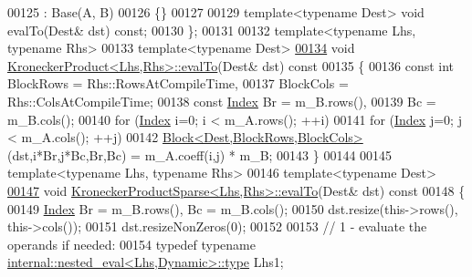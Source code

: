 \begin{DoxyCode}
00125       : Base(A, B)
00126     \{\}
00127 
00129     \textcolor{keyword}{template}<\textcolor{keyword}{typename} Dest> \textcolor{keywordtype}{void} evalTo(Dest& dst) \textcolor{keyword}{const};
00130 \};
00131 
00132 \textcolor{keyword}{template}<\textcolor{keyword}{typename} Lhs, \textcolor{keyword}{typename} Rhs>
00133 \textcolor{keyword}{template}<\textcolor{keyword}{typename} Dest>
\hyperlink{class_eigen_1_1_kronecker_product_a10f65aca36ed69da354e70b300b5a223}{00134} \textcolor{keywordtype}{void} \hyperlink{class_eigen_1_1_kronecker_product_a10f65aca36ed69da354e70b300b5a223}{KroneckerProduct<Lhs,Rhs>::evalTo}(Dest& dst)\textcolor{keyword}{ const}
00135 \textcolor{keyword}{}\{
00136   \textcolor{keyword}{const} \textcolor{keywordtype}{int} BlockRows = Rhs::RowsAtCompileTime,
00137             BlockCols = Rhs::ColsAtCompileTime;
00138   \textcolor{keyword}{const} \hyperlink{namespace_eigen_a62e77e0933482dafde8fe197d9a2cfde}{Index} Br = m\_B.rows(),
00139               Bc = m\_B.cols();
00140   \textcolor{keywordflow}{for} (\hyperlink{namespace_eigen_a62e77e0933482dafde8fe197d9a2cfde}{Index} i=0; i < m\_A.rows(); ++i)
00141     \textcolor{keywordflow}{for} (\hyperlink{namespace_eigen_a62e77e0933482dafde8fe197d9a2cfde}{Index} j=0; j < m\_A.cols(); ++j)
00142       \hyperlink{group___core___module_class_eigen_1_1_block}{Block<Dest,BlockRows,BlockCols>}(dst,i*Br,j*Bc,Br,Bc) = m\_A.coeff(i,j) 
      * m\_B;
00143 \}
00144 
00145 \textcolor{keyword}{template}<\textcolor{keyword}{typename} Lhs, \textcolor{keyword}{typename} Rhs>
00146 \textcolor{keyword}{template}<\textcolor{keyword}{typename} Dest>
\hyperlink{class_eigen_1_1_kronecker_product_sparse_a8b7269c23294765e0965b70b5af2557b}{00147} \textcolor{keywordtype}{void} \hyperlink{class_eigen_1_1_kronecker_product_sparse_a8b7269c23294765e0965b70b5af2557b}{KroneckerProductSparse<Lhs,Rhs>::evalTo}(Dest& dst)\textcolor{keyword}{ const}
00148 \textcolor{keyword}{}\{
00149   \hyperlink{namespace_eigen_a62e77e0933482dafde8fe197d9a2cfde}{Index} Br = m\_B.rows(), Bc = m\_B.cols();
00150   dst.resize(this->rows(), this->cols());
00151   dst.resizeNonZeros(0);
00152   
00153   \textcolor{comment}{// 1 - evaluate the operands if needed:}
00154   \textcolor{keyword}{typedef} \textcolor{keyword}{typename} \hyperlink{class_eigen_1_1internal_1_1_tensor_lazy_evaluator_writable}{internal::nested\_eval<Lhs,Dynamic>::type} Lhs1;

\end{DoxyCode}
